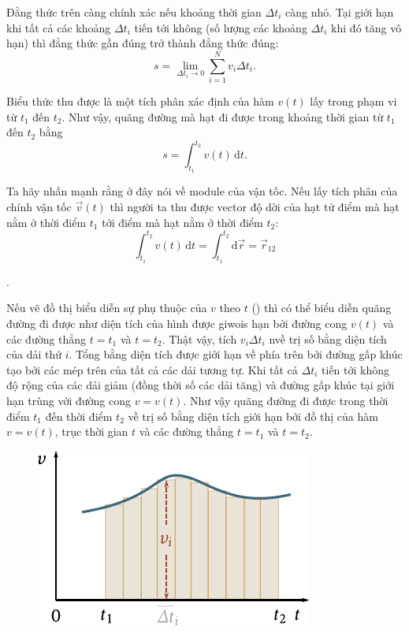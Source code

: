 \noindent
Đằng thức trên càng chính xác nếu khoảng thời gian $\Delta t_i$ càng nhỏ. Tại giới hạn khi tất cả các khoảng $\Delta t_i$ tiến tới không (số lượng các khoảng $\Delta t_i$ khi đó tăng vô hạn) thì đẳng thức gần đúng trở thành đẳng thức đúng:
\begin{equation*}
s = \lim_{\Delta t_i\to 0} \sum_{i=1}^{N} v_i \Delta t_i.
\end{equation*}

Biểu thức thu được là một tích phân xác định của hàm $v(t)$ lấy trong phạm vi từ $t_1$ đến $t_2$. Như vậy, quãng đường mà hạt đi được trong khoảng thời gian từ $t_1$ đến $t_2$ bằng
\begin{equation}\label{eq:1_74}
s = \int_{t_1}^{t_2} v(t)\,\mathrm{d}t.
\end{equation}

\noindent
Ta hãy nhấn mạnh rằng ở đây nói về module của vận tốc. Nếu lấy tích phân của chính vận tốc $\vec{v}(t)$ thì người ta thu được vector độ dời của hạt tử điểm mà hạt nằm ở thời điểm $t_1$ tới điểm mà hạt nằm ở thời điểm $t_2$:
\begin{equation}\label{eq:1_75}
\int_{t_1}^{t_2} v(t)\,\mathrm{d}t = \int_{t_1}^{t_2} \mathrm{d}\vec{r} = \vec{r}_{12}
\end{equation}

.

Nếu vẽ đồ thị biểu diễn sự phụ thuộc của $v$ theo $t$ () thì có thể biểu diễn quãng đường đi được như diện tích của hình được giwois hạn bởi đường cong $v(t)$ và các đường thẳng $t = t_1$ và $t = t_2$. Thật vậy, tích $v_i\Delta t_i$ nvề trị số bằng diện tích của dải thứ $i$. Tổng  bằng diện tích được giới hạn về phía trên bởi đường gấp khúc tạo bởi các mép trên của tất cả các dải tương tự. Khi tất cả $\Delta t_i$ tiến tới không độ rộng của các dải giảm (đồng thời số các dải tăng) và đường gấp khúc tại giới hạn trùng với đường cong $v = v(t)$. Như vậy quãng đường đi được trong thời điểm $t_1$ đến thời điểm $t_2$ về trị số bằng diện tích giới hạn bởi đồ thị của hàm $v = v(t)$, trục thời gian $t$ và các đường thẳng $t= t_1$ và $t = t_2$.

\begin{figure}[!htb]
	\begin{center}
		\includegraphics[scale=1]{figures/ch_01/fig_1_26.pdf}
		\caption[]{}
		\label{fig:1_26}
	\end{center}
\end{figure}

